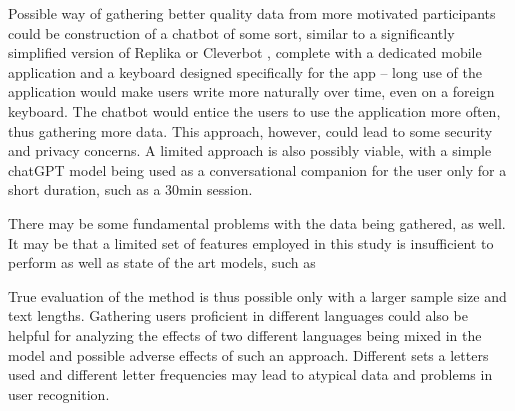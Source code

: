Possible way of gathering better quality data from more motivated participants could be construction of a chatbot of some sort, similar to a significantly simplified version of Replika or Cleverbot , complete with a dedicated mobile application and a keyboard designed specifically for the app -- long use of the application would make users write more naturally over time, even on a foreign keyboard. The chatbot would entice the users to use the application more often, thus gathering more data. This approach, however, could lead to some security and privacy concerns. A limited approach is also possibly viable, with a simple chatGPT model being used as a conversational companion for the user only for a short duration, such as a 30min session.

There may be some fundamental problems with the data being gathered, as well. It may be that a limited set of features employed in this study is insufficient to perform as well as state of the art models, such as 

True evaluation of the method is thus possible only with a larger sample size and text lengths. Gathering users proficient in different languages could also be helpful for analyzing the effects of two different languages being mixed in the model and possible adverse effects of such an approach. Different sets a letters used and different letter frequencies may lead to atypical data and problems in user recognition.
